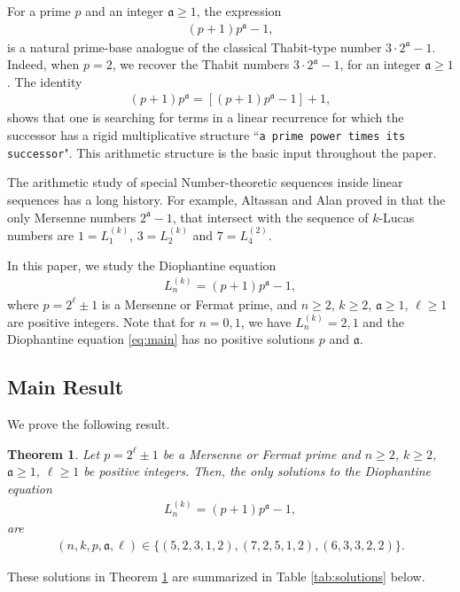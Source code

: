 \documentclass[11pt,a4paper]{article}
\newtheorem{theorem}{Theorem}[section]
\numberwithin{equation}{section}
\numberwithin{table}{section}
\numberwithin{figure}{section}
\begin{document}
For a prime $p$ and an integer $\mathfrak{a}\ge 1$, the expression 
\begin{align*}
	(p+1)p^\mathfrak{a}-1,
\end{align*}
is a natural prime-base analogue of the classical Thabit-type number $3\cdot 2^\mathfrak{a}-1$. Indeed, when $p=2$, we recover the Thabit numbers $3\cdot 2^\mathfrak{a}-1$, for an integer $\mathfrak{a}\ge 1$. The identity 
\begin{align*}
	(p+1)p^\mathfrak{a}=\left[(p+1)p^\mathfrak{a}-1\right]+1,
\end{align*}
shows that one is searching for terms in a linear recurrence for which the successor has a rigid multiplicative structure ``\texttt{a prime power times its successor}". This arithmetic structure is the basic input throughout the paper.

The arithmetic study of special Number-theoretic sequences inside linear sequences has a long history. For example, Altassan and Alan proved in \cite{alta} that the only Mersenne numbers $2^\mathfrak{a}-1$, that intersect with the sequence of $k$-Lucas numbers are $1=L_1^{(k)}$, $3=L_2^{(k)}$ and $7=L_4^{(2)}$. 

In this paper, we study the Diophantine equation 
\begin{align}\label{eq:main}
	L_n^{(k)} = (p+1)p^\mathfrak{a}-1,
\end{align}
where $p=2^{\ell}\pm 1$ is a Mersenne or Fermat prime, and $n\ge 2$, $k\ge 2$, $\mathfrak{a}\ge 1$, $\ell \ge 1$ are positive integers. Note that for $n=0,1$, we have $L_n^{(k)}=2,1$ and the Diophantine equation \eqref{eq:main} has no positive solutions $p$ and $\mathfrak{a}$.

\subsection{Main Result}
We prove the following result.

\begin{theorem}
\label{thm1.1} 
Let $p=2^{\ell}\pm 1$ be a Mersenne or Fermat prime and $n\ge 2$, $k\ge 2$, $\mathfrak{a}\ge 1$, $\ell \ge 1$ be positive integers.
Then, the only solutions to the Diophantine equation 
\begin{align*}
	L_n^{(k)} = (p+1)p^\mathfrak{a}-1,
\end{align*}
are 
\begin{align*}
	(n,k,p,\mathfrak{a},\ell) \in \{(5,2,3,1,2),(7,2,5,1,2),(6,3,3,2,2)\}.
\end{align*}
\end{theorem}
These solutions in Theorem \ref{thm1.1} are summarized in Table \ref{tab:solutions} below.
\end{document}
